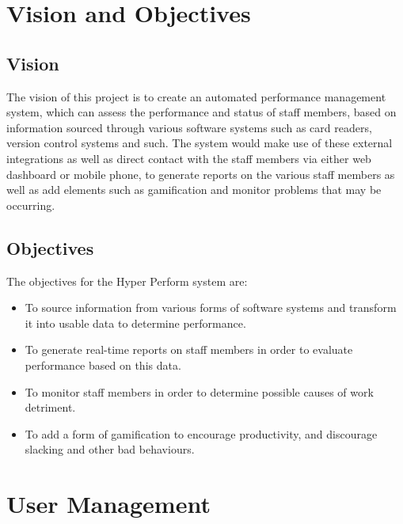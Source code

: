 \documentclass[11pt,a4paper]{article}
\begin{document}
\section{Vision and Objectives}
\subsection{Vision}
The vision of this project is to create an automated performance management system, which can assess the performance and status of staff members, based on information sourced through various software systems such as card readers, version control systems and such. The system would make use of these external integrations as well as direct contact with the staff members via either web dashboard or mobile phone, to generate reports on the various staff members as well as add elements such as gamification and monitor problems that may be occurring.

\subsection{Objectives}
The objectives for the Hyper Perform system are:
\begin{itemize}
	\item To source information from various forms of software systems and transform it into usable data to determine performance.
	\item To generate real-time reports on staff members in order to evaluate performance based on this data.
	\item To monitor staff members in order to determine possible causes of work detriment.
	\item To add a form of gamification to encourage productivity, and discourage slacking and other bad behaviours.

\end{itemize}



\section{User Management}
\end{document}

